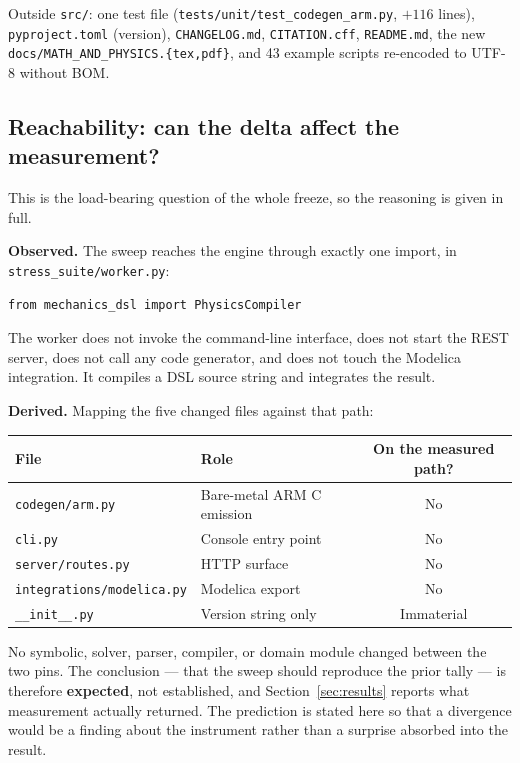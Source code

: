 \documentclass[11pt,a4paper]{article}
\begin{document}
Outside \texttt{src/}: one test file (\texttt{tests/unit/test\_codegen\_arm.py},
$+116$ lines), \texttt{pyproject.toml} (version), \texttt{CHANGELOG.md},
\texttt{CITATION.cff}, \texttt{README.md}, the new
\texttt{docs/MATH\_AND\_PHYSICS.\{tex,pdf\}}, and 43 example scripts re-encoded
to UTF-8 without BOM.

\subsection{Reachability: can the delta affect the measurement?}\label{sec:reach}

This is the load-bearing question of the whole freeze, so the reasoning is
given in full.

\noindent\textbf{Observed.} The sweep reaches the engine through exactly one
import, in \texttt{stress\_suite/worker.py}:

\begin{lstlisting}
from mechanics_dsl import PhysicsCompiler
\end{lstlisting}

\noindent The worker does not invoke the command-line interface, does not start
the REST server, does not call any code generator, and does not touch the
Modelica integration. It compiles a DSL source string and integrates the
result.

\noindent\textbf{Derived.} Mapping the five changed files against that path:

\begin{center}
\begin{tabular}{@{}lL{0.30\textwidth}c@{}}
\toprule
\textbf{File} & \textbf{Role} & \textbf{On the measured path?} \\
\midrule
\texttt{codegen/arm.py}           & Bare-metal ARM C emission & No \\
\texttt{cli.py}                   & Console entry point       & No \\
\texttt{server/routes.py}         & HTTP surface              & No \\
\texttt{integrations/modelica.py} & Modelica export           & No \\
\texttt{\_\_init\_\_.py}          & Version string only       & Immaterial \\
\bottomrule
\end{tabular}
\end{center}

No symbolic, solver, parser, compiler, or domain module changed between the two
pins. The conclusion --- that the sweep should reproduce the prior tally --- is
therefore \textbf{expected}, not established, and Section~\ref{sec:results}
reports what measurement actually returned. The prediction is stated here so
that a divergence would be a finding about the instrument rather than a
surprise absorbed into the result.
\end{document}
